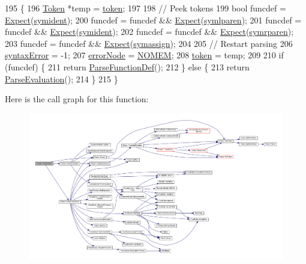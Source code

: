 \begin{DoxyCode}
195 \{
196     \hyperlink{structToken}{Token} *temp = \hyperlink{classParser_a467028559d31c5b33f16ca8be56715cc}{token};
197 
198     \textcolor{comment}{// Peek tokens}
199     \textcolor{keywordtype}{bool} funcdef = \hyperlink{classParser_a811765334b0cd3f01152c35c9f5bcaec}{Expect}(\hyperlink{lex_8h_a7feef761cd73fac6e25b8bb80d2c4e54ade7694e5efc9616383548e57122faea5}{symident});
200     funcdef = funcdef && \hyperlink{classParser_a811765334b0cd3f01152c35c9f5bcaec}{Expect}(\hyperlink{lex_8h_a7feef761cd73fac6e25b8bb80d2c4e54ad92b5471ad4a0b9fc95faae6ca2172ad}{symlparen});
201     funcdef = funcdef && \hyperlink{classParser_a811765334b0cd3f01152c35c9f5bcaec}{Expect}(\hyperlink{lex_8h_a7feef761cd73fac6e25b8bb80d2c4e54ade7694e5efc9616383548e57122faea5}{symident});
202     funcdef = funcdef && \hyperlink{classParser_a811765334b0cd3f01152c35c9f5bcaec}{Expect}(\hyperlink{lex_8h_a7feef761cd73fac6e25b8bb80d2c4e54a59c8837a9f31298813b4703cefbd185e}{symrparen});
203     funcdef = funcdef && \hyperlink{classParser_a811765334b0cd3f01152c35c9f5bcaec}{Expect}(\hyperlink{lex_8h_a7feef761cd73fac6e25b8bb80d2c4e54a648933f05e3bcba968a27d425933784d}{symassign});
204 
205     \textcolor{comment}{// Restart parsing}
206     \hyperlink{classParser_ae50a199b804c9f5e8342a4d0a1ae6a95}{syntaxError} = -1;
207     \hyperlink{classParser_ab482ff79113ad2f1ef60bc6dd18528d1}{errorNode} = \hyperlink{platform_8h_a46ff2bfbf0d44b8466a2251d5bd5e6f8}{NOMEM};
208     \hyperlink{classParser_a467028559d31c5b33f16ca8be56715cc}{token} = temp;
209 
210     \textcolor{keywordflow}{if} (funcdef) \{
211         \textcolor{keywordflow}{return} \hyperlink{classParser_a0e8b1f794af2b9923bc3fcb7498004f9}{ParseFunctionDef}();
212     \} \textcolor{keywordflow}{else} \{
213         \textcolor{keywordflow}{return} \hyperlink{classParser_a19c5b6055d066d21ad39a32287e833c2}{ParseEvaluation}();
214     \}
215 \}
\end{DoxyCode}


Here is the call graph for this function\+:\nopagebreak
\begin{figure}[H]
\begin{center}
\leavevmode
\includegraphics[width=350pt]{classParser_aca8329fb5ee4812398144fd1d647fe39_cgraph}
\end{center}
\end{figure}





